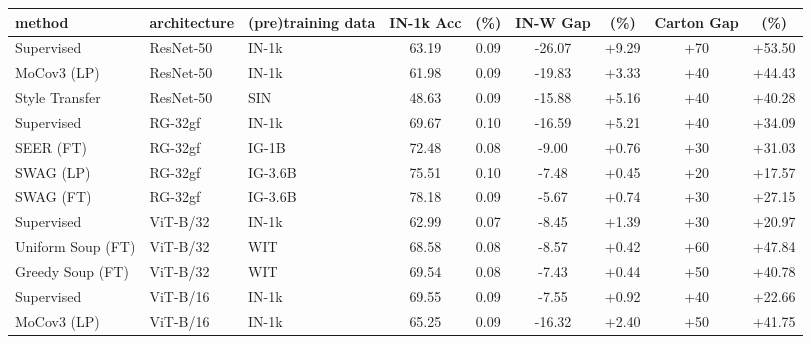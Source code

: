 \documentclass[10pt,twocolumn,letterpaper]{article}
\begin{document}
\begin{table*}[h]
\centering
\begin{adjustbox}{width=\linewidth}
\begin{tabular}{@{}lll|cc|cc|cc@{}}
\toprule
method  & architecture & (pre)training data                  & IN-1k Acc  &  (\%) & IN-W Gap  &  (\%)  & Carton Gap  &  (\%)  \\ \midrule
Supervised       & ResNet-50    & IN-1k      & 63.19     & 0.09      & -26.07        & +9.29              & +70        & +53.50                      \\
MoCov3 (LP)      & ResNet-50    & IN-1k      & 61.98     & 0.09      & -19.83        & +3.33              & +40        & +44.43                      \\
Style Transfer   & ResNet-50    & SIN        & 48.63     & 0.09      & -15.88        & +5.16              & +40        & +40.28                      \\  \midrule
Supervised       & RG-32gf      & IN-1k      & 69.67     & 0.10      & -16.59        & +5.21              & +40        & +34.09                      \\
SEER (FT)        & RG-32gf      & IG-1B      & 72.48     & 0.08      & -9.00         & +0.76              & +30        & +31.03                      \\
SWAG (LP)        & RG-32gf      & IG-3.6B    & 75.51     & 0.10      & -7.48         & +0.45              & +20        & +17.57                      \\
SWAG (FT)        & RG-32gf      & IG-3.6B    & 78.18     & 0.09      & -5.67         & +0.74              & +30        & +27.15                      \\ \midrule
Supervised       & ViT-B/32     & IN-1k      & 62.99     & 0.07      & -8.45         & +1.39              & +30        & +20.97                      \\
Uniform Soup (FT)    & ViT-B/32     & WIT     & 68.58     & 0.08      & -8.57         & +0.42              & +60        & +47.84                      \\
Greedy Soup (FT)    & ViT-B/32     & WIT     & 69.54     & 0.08      & -7.43         & +0.44              & +50        & +40.78                      \\
\midrule
Supervised       & ViT-B/16     & IN-1k      & 69.55     & 0.09      & -7.55         & +0.92              & +40        & +22.66                      \\
MoCov3 (LP)      & ViT-B/16     & IN-1k      & 65.25     & 0.09      & -16.32        & +2.40              & +50        & +41.75                      \\

\end{tabular}
\end{adjustbox}
\end{table*}
\end{document}
